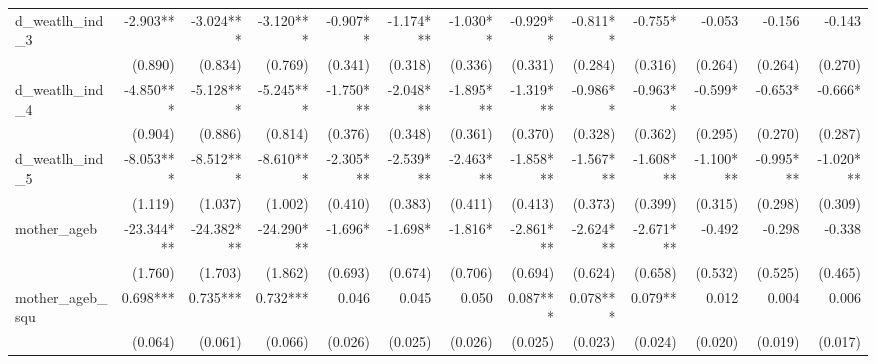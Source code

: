 \begin{tabular}{lrrrrrrrrrrrr}
d\_weatlh\_ind\_3                           &     -2.903** &    -3.024*** &    -3.120*** &     -0.907** &    -1.174*** &     -1.030** &     -0.929** &     -0.811** &      -0.755* &       -0.053 &       -0.156 &       -0.143 \\ 
                                            &      (0.890) &      (0.834) &      (0.769) &      (0.341) &      (0.318) &      (0.336) &      (0.331) &      (0.284) &      (0.316) &      (0.264) &      (0.264) &      (0.270) \\ 
d\_weatlh\_ind\_4                           &    -4.850*** &    -5.128*** &    -5.245*** &    -1.750*** &    -2.048*** &    -1.895*** &    -1.319*** &     -0.986** &     -0.963** &      -0.599* &      -0.653* &      -0.666* \\ 
                                            &      (0.904) &      (0.886) &      (0.814) &      (0.376) &      (0.348) &      (0.361) &      (0.370) &      (0.328) &      (0.362) &      (0.295) &      (0.270) &      (0.287) \\ 
d\_weatlh\_ind\_5                           &    -8.053*** &    -8.512*** &    -8.610*** &    -2.305*** &    -2.539*** &    -2.463*** &    -1.858*** &    -1.567*** &    -1.608*** &    -1.100*** &    -0.995*** &    -1.020*** \\ 
                                            &      (1.119) &      (1.037) &      (1.002) &      (0.410) &      (0.383) &      (0.411) &      (0.413) &      (0.373) &      (0.399) &      (0.315) &      (0.298) &      (0.309) \\ 
mother\_ageb                                &   -23.344*** &   -24.382*** &   -24.290*** &      -1.696* &      -1.698* &      -1.816* &    -2.861*** &    -2.624*** &    -2.671*** &       -0.492 &       -0.298 &       -0.338 \\ 
                                            &      (1.760) &      (1.703) &      (1.862) &      (0.693) &      (0.674) &      (0.706) &      (0.694) &      (0.624) &      (0.658) &      (0.532) &      (0.525) &      (0.465) \\ 
mother\_ageb\_squ                           &     0.698*** &     0.735*** &     0.732*** &        0.046 &        0.045 &        0.050 &     0.087*** &     0.078*** &      0.079** &        0.012 &        0.004 &        0.006 \\ 
                                            &      (0.064) &      (0.061) &      (0.066) &      (0.026) &      (0.025) &      (0.026) &      (0.025) &      (0.023) &      (0.024) &      (0.020) &      (0.019) &      (0.017) \\ 

\end{tabular}
